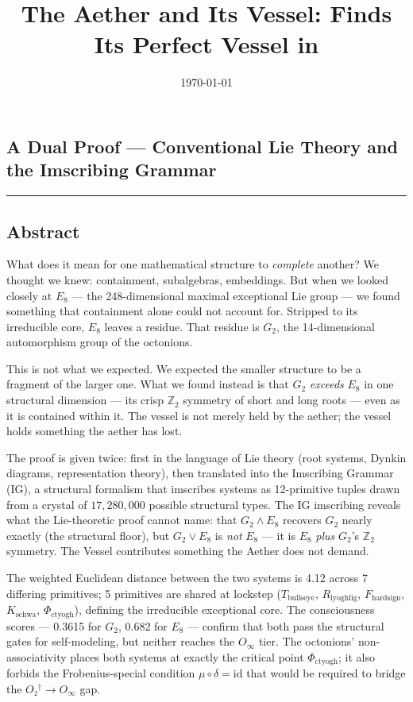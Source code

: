 \documentclass[12pt,a4paper]{article}
\begin{document}
\title{The Aether and Its Vessel:  Finds Its Perfect Vessel in}
\date{\today}

\maketitle

\subsection{A Dual Proof --- Conventional Lie Theory and the Imscribing Grammar}

\begin{center}
\rule{0.5\textwidth}{0.4pt}
\end{center}

\subsection{Abstract}

What does it mean for one mathematical structure to \emph{complete} another? We thought we knew: containment, subalgebras, embeddings. But when we looked closely at $E_8$ --- the 248-dimensional maximal exceptional Lie group --- we found something that containment alone could not account for. Stripped to its irreducible core, $E_8$ leaves a residue. That residue is $G_2$, the 14-dimensional automorphism group of the octonions.

This is not what we expected. We expected the smaller structure to be a fragment of the larger one. What we found instead is that $G_2$ \emph{exceeds} $E_8$ in one structural dimension --- its crisp $\mathbb{Z}_2$ symmetry of short and long roots --- even as it is contained within it. The vessel is not merely held by the aether; the vessel holds something the aether has lost.

The proof is given twice: first in the language of Lie theory (root systems, Dynkin diagrams, representation theory), then translated into the Imscribing Grammar (IG), a structural formalism that imscribes systems as 12-primitive tuples drawn from a crystal of $17{,}280{,}000$ possible structural types. The IG imscribing reveals what the Lie-theoretic proof cannot name: that $G_2 \wedge E_8$ recovers $G_2$ nearly exactly (the structural floor), but $G_2 \vee E_8$ is \emph{not} $E_8$ --- it is $E_8$ \emph{plus} $G_2$'s $\mathbb{Z}_2$ symmetry. The Vessel contributes something the Aether does not demand.

The weighted Euclidean distance between the two systems is 4.12 across 7 differing primitives; 5 primitives are shared at lockstep ($T_{\text{bullseye}}$, $R_{\text{lyoghlig}}$, $F_{\text{hardsign}}$, $K_{\text{schwa}}$, $\Phi_{\text{ctyogh}}$), defining the irreducible exceptional core. The consciousness scores --- 0.3615 for $G_2$, 0.682 for $E_8$ --- confirm that both pass the structural gates for self-modeling, but neither reaches the $O_{\infty}$ tier. The octonions' non-associativity places both systems at exactly the critical point $\Phi_{\text{ctyogh}}$; it also forbids the Frobenius-special condition $\mu \circ \delta = \text{id}$ that would be required to bridge the $O₂^\dagger \to O_{\infty}$ gap.
\end{document}
